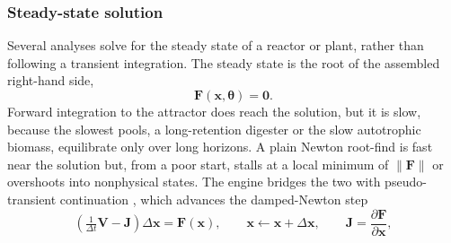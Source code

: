 \documentclass{article}
\begin{document}
\subsubsection{Steady-state solution}
\label{sec:methods-steady}

Several analyses solve for the steady state of a reactor or plant, rather than following a transient integration. The steady state is the root of the assembled right-hand side,
\begin{equation}
  \mathbf{F}(\mathbf{x}, \boldsymbol{\theta}) = \mathbf{0}.
  \label{eq:steady}
\end{equation}
Forward integration to the attractor does reach the solution, but it is slow, because the slowest pools, a long-retention digester or the slow autotrophic biomass, equilibrate only over long horizons. A plain Newton root-find is fast near the solution but, from a poor start, stalls at a local minimum of \(\lVert\mathbf{F}\rVert\) or overshoots into nonphysical states. The engine bridges the two with pseudo-transient continuation \citep{kelley1998, pattison2014}, which advances the damped-Newton step
\begin{equation}
  \left(\tfrac{1}{\Delta t}\mathbf{V} - \mathbf{J}\right)\Delta\mathbf{x} = \mathbf{F}(\mathbf{x}),
  \qquad \mathbf{x} \leftarrow \mathbf{x} + \Delta\mathbf{x},
  \qquad \mathbf{J} = \frac{\partial\mathbf{F}}{\partial\mathbf{x}},
  \label{eq:ptc}
\end{equation}
\end{document}
